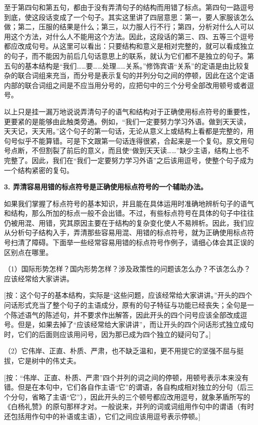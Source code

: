 至于第四句和第五句，都由于没有弄清句子的结构而用错了标点。第四句一路逗号到底，使这段话变成了一个句子。其实这里讲了四层意思：第一，要人家服该怎么做；第二，压服的结果是什么；第三，以力服人行不行；第四，分析对什么人可以用这个方法，对什么人不能用这个方法。因此，这段话的第三、四、五等三个逗号都应改成句号。从这里可以看出：只要结构和意义是相对完整的，就可以看成独立的句子，而不能因为前后几句话意思上的联系，就认为它们都不是独立的句子。第五句的基本结构是“我们……要……处理……关系。”修饰宾语“关系”的定语是由比较复杂的联合词组来充当，而分号是表示复句的并列分句之间的停顿，因此在这个定语内部的联合词组之间是不应当用分号的，应把句中的三个分号全部改用顿号或者逗号。

以上只是挂一漏万地说说弄清句子的语气和结构对于正确使用标点符号的重要性，更要紧的是能够由此触类旁通。例如，“我们一定要努力学习外语。做到天天读，天天记，天天用。”这个句子的第一句话，无论从意义上或结构上看都是完整的，用句号似乎不能算错。可是下文跟第一句话连得很紧，合起来是一个复句。原文用句号点断，不但割裂了前后的意义，而且使“做到天天读……”缺少主语，结构上也不完整了。因此，我们在“我们一定要努力学习外语”之后该用逗号，使整个句子成为一个结构紧密的复句。

\textbf{3. 弄清容易用错的标点符号是正确使用标点符号的一个辅助办法。}

如果我们掌握了标点符号的基本知识，并且能在具体运用时准确地辨析句子的语气和结构，那么所加的标点一般不会出错。不过，有些标点符号在具体的句子中往往仍被用混、用错，究其原因主要在于结构的复杂变化使人不易辨析。因此，我们应从分析句子结构入手，弄清那些容易用混、用错的标点符号，就为正确使用标点符号扫清了障碍。下面举一些经常容易用错的标点符号作例子，请细心体会其正误的区别点在哪里。

（1）国际形势怎样？国内形势怎样？涉及政策性的问题该怎么办？不该怎么办？应该经常给大家讲讲。

[按：这个句子的基本结构，实际是“这些问题，应该经常给大家讲讲。”开头的四个问话形式充当了整个句子的主语成分，原有的句子特征与功能已经丧失；全句是一个陈述语气的陈述句，并不要求作出解答，因此开头的四个问号应该全部改成逗号。但是，如果去掉了“应该经常给大家讲讲”，而让开头的四个问话形式独立成句时，它们的后面则应该用问号，因为那已成为四个独立的疑问句了。]

（2）它伟岸、正直、朴质、严肃，也不缺乏温和，更不用提它的坚强不屈与挺拔，它是树中的伟丈夫。

[按：“伟岸、正直、朴质、严肃”四个并列的词之间的停顿，用顿号表示本来没有错。但是在本句中，它们各自作主语“它”的谓语，各自构成相对独立的分句（后三个分句，省略了主语“它”），因此开头的三个顿号都应改用逗号，就象茅盾所写的《白杨礼赞》的原句那样才对。一般说来，并列的词或词组用作句中的谓语（有时还包括用作句中的补语或主语），它们之间应该用逗号表示停顿。]

